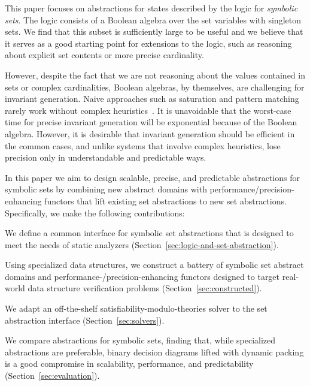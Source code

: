 This paper focuses on abstractions for states described by the logic for \emph{symbolic sets}.  The logic consists of a Boolean algebra over the set variables with singleton sets. We find that this subset is sufficiently large to be useful and we
believe that it serves as a good starting point for extensions to the
logic, such as reasoning about explicit set contents or more precise
cardinality.

However, despite the fact that we are not reasoning about the values
contained in sets or complex cardinalities, Boolean algebras, by
themselves, are challenging for invariant generation.
Naive approaches such as saturation and pattern matching rarely work
without complex heuristics~\cite{fixbag:cav:11,ab:ecoop:13}.
It is unavoidable that the worst-case time for precise invariant
generation will be exponential because of the Boolean algebra.
However, it is desirable that invariant generation should be efficient
in the common cases, and unlike systems that involve complex heuristics,
lose precision only in understandable and predictable ways.

In this paper we aim to design scalable, precise, and predictable abstractions for symbolic sets by combining new abstract domains with performance/precision-enhancing functors that lift existing set abstractions to new set abstractions.  Specifically, we make the following contributions:
%
\begin{compactitem}
\item We define a common interface for symbolic set abstractions that is designed to meet the needs of static analyzers (Section~\ref{sec:logic-and-set-abstraction}).
%
\item Using specialized data structures, we construct a battery of symbolic set abstract domains and performance-/precision-enhancing functors designed to target real-world data structure verification problems (Section~\ref{sec:constructed}).
%
\item We adapt an off-the-shelf satisfiability-modulo-theories solver to the set abstraction interface (Section~\ref{sec:solvers}).
%
\item We compare abstractions for symbolic sets, finding that, while specialized abstractions are preferable, binary decision diagrams lifted with dynamic packing is a good compromise in scalability, performance, and predictability (Section~\ref{sec:evaluation}).
%
\end{compactitem}